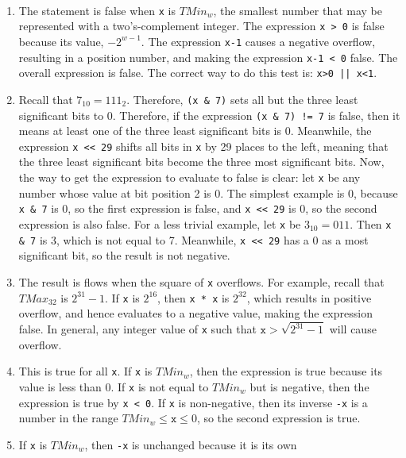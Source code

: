 \documentclass[12pt]{article}
\newenvironment{sol}[1][Solution]{\begin{trivlist}
		\item[\hskip \labelsep {\bfseries #1:}]}{\end{trivlist}}
\begin{document}
\begin{sol}
	\
	\begin{enumerate}[label=(\alph*)]
		\item The statement is false when \texttt{x} is $TMin_w$, the smallest number
		that may be represented with a two's-complement integer. The expression
		\texttt{x > 0} is false because its value, $-2^{w-1}$. The expression
		\texttt{x-1} causes a negative overflow, resulting in a position number,
		and making the expression \texttt{x-1 < 0} false. The overall expression
		is false. The correct way to do this test is: \texttt{x>0 || x<1}.
		\item Recall that $7_{10}=111_2$. Therefore, \texttt{(x \& 7)} sets all
		but the three least significant bits to 0. Therefore, if the expression
		\texttt{(x \& 7) != 7} is false, then it means at least one of the three
		least significant bits is 0. Meanwhile, the expression \texttt{x << 29}
		shifts all bits in \texttt{x} by 29 places to the left, meaning that
		the three least significant bits become the three most significant bits.
		Now, the way to get the expression to evaluate to false is clear:
		let \texttt{x} be any number whose value at bit position 2 is 0. The simplest
		example is 0, because \texttt{x \& 7} is 0, so the first expression is false, and
		\texttt{x << 29} is 0, so the second expression is also false. For a less trivial
		example, let \texttt{x} be $3_{10}=011$. Then \texttt{x \& 7} is 3, which is
		not equal to 7. Meanwhile, \texttt{x << 29} has a 0 as a most significant bit,
		so the result is not negative.
		\item The result is flows when the square of \texttt{x} overflows. For example,
		recall that $TMax_{32}$ is $2^{31}-1$. If \texttt{x} is $2^{16}$, then
		\texttt{x * x} is $2^{32}$, which results in positive overflow, and hence
		evaluates to a negative value, making the expression false. In general, any
		integer value of \texttt{x} such that $\texttt{x} > \sqrt{2^{31}-1}$ will cause
		overflow.
		\item This is true for all \texttt{x}. If \texttt{x} is $TMin_w$, then
		the expression is true because its value is less than 0. If \texttt{x} is
		not equal to $TMin_w$ but is negative, then the expression is true by
		\texttt{x < 0}. If \texttt{x} is non-negative, then its inverse \texttt{-x}
		is a number in the range $TMin_w\leq \texttt{x} \leq 0$, so the second expression
		is true.
		\item If \texttt{x} is $TMin_w$, then \texttt{-x} is unchanged because it is its own

\end{enumerate}
\end{sol}
\end{document}
